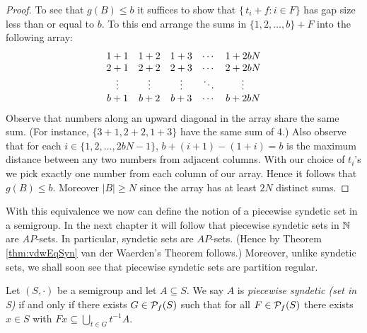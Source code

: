 \begin{proof}
  To see that $g(B) \le b$ it suffices to show that $\{\, t_i + f : i \in F\}$ has gap size less than or equal to $b$.
  To this end arrange the sums in $\{1, 2, \ldots, b\} + F$ into the following array:
  \[
    \begin{array}[t]{ccccc}
      1+1 & 1+2 & 1+3 & \cdots & 1+2bN \\
      2+1 & 2+2 & 2+3 & \cdots & 2+2bN \\
      \vdots & \vdots & \vdots & \ddots & \vdots \\
      b+1 & b+2 & b+3 & \cdots & b+2bN 
    \end{array}
  \]
  Observe that numbers along an upward diagonal in the array share the same sum. 
  (For instance, $\{3+1, 2+2, 1+3\}$ have the same sum of 4.)
  Also observe that for each $i \in \{1, 2, \ldots, 2bN - 1\}$, $b + (i+1) - (1 +i) = b$ is the maximum distance between any two numbers from adjacent columns. 
  With our choice of $t_i$'s we pick exactly one number from each column of our array.
  Hence it follows that $g(B) \le b$.
  Moreover $|B| \ge N$ since the array has at least $2N$ distinct sums. 
\end{proof}

With this equivalence we now can define the notion of a piecewise
syndetic set in a semigroup. 
In the next chapter it will follow that piecewise syndetic sets in $\mathbb{N}$ are $AP$-sets.
In particular, syndetic sets are $AP$-sets.
(Hence by Theorem \ref{thm:vdwEqSyn} van der Waerden's Theorem follows.)
Moreover, unlike syndetic sets, we shall soon see that piecewise syndetic sets are partition regular.%

\begin{defn}
  Let $(S, \cdot)$ be a semigroup and let $A \subseteq S$.
  We say $A$ is \emph{piecewise syndetic (set in S)} if and only if there exists $G \in \mathcal{P}_f(S)$ such that for all $F \in \mathcal{P}_f(S)$ there exists $x \in S$ with $Fx \subseteq \bigcup_{t \in G} t^{-1}A$.
\end{defn}

